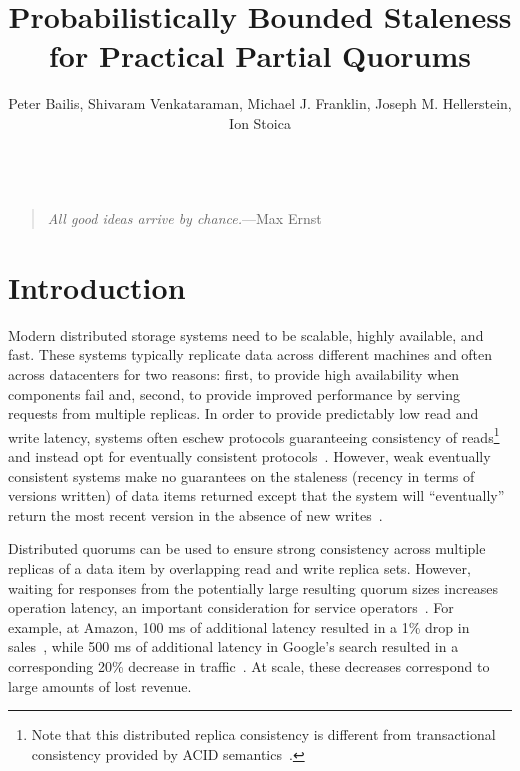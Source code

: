 \documentclass{vldb}
\title{Probabilistically Bounded Staleness\\ for Practical Partial Quorums}
\author{Peter Bailis, Shivaram Venkataraman, Michael J. Franklin, Joseph M. Hellerstein, Ion Stoica\\
\affaddr{University of California, Berkeley}\\
\affaddr{\{pbailis, shivaram, franklin, hellerstein, istoica\}@cs.berkeley.edu}}
\newcommand{\sectionskip}{-0em}
\begin{document}

\maketitle

\begin{quote}
\textit{All good ideas arrive by chance.}---Max Ernst
\end{quote}



\vspace{\sectionskip}\section{Introduction}

Modern distributed storage systems need to be scalable, highly
available, and fast.  These systems typically replicate data across
different machines and often across datacenters for two reasons:
first, to provide high availability when components fail and, second,
to provide improved performance by serving requests from multiple
replicas.  In order to provide predictably low read and write latency,
systems often eschew protocols guaranteeing consistency of
reads\footnote{Note that this distributed replica consistency is
  different from transactional consistency provided by ACID
  semantics~\cite{nosql, urbanmyths}\vspace{-2em}.} and instead opt
for eventually consistent protocols~\cite{cassandradefault,
  abadilatconsist, dynamo, feinbergpc, reddit, riaktalkone, outbrain}.
However, weak eventually consistent systems make no guarantees on the
staleness (recency in terms of versions written) of data items
returned except that the system will ``eventually'' return the most
recent version in the absence of new writes~\cite{vogels-defs}.

Distributed quorums can be used to ensure strong consistency across
multiple replicas of a data item by overlapping read and write replica
sets. However, waiting for responses from the potentially large
resulting quorum sizes increases operation latency, an important
consideration for service operators~\cite{perf-impact}. For example,
at Amazon, 100 ms of additional latency resulted in a 1\% drop in
sales~\cite{amazon-latency}, while 500 ms of additional latency in
Google's search resulted in a corresponding 20\% decrease in
traffic~\cite{google-talk}.  At scale, these decreases correspond to
large amounts of lost revenue.
\end{document}
